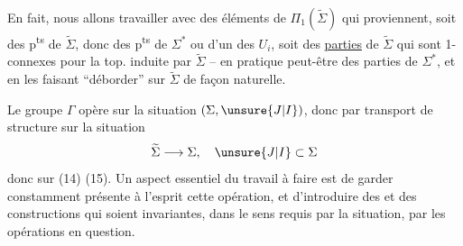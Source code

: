 En fait, nous allons travailler avec des éléments de $\Pi_1(\widetilde\Sigma)$ qui proviennent, soit des p\textsuperscript{ts} de $\widetilde\Sigma$, donc des p\textsuperscript{ts} de $\Sigma^*$ ou d'un des $U_i$, soit des \uline{parties} de $\widetilde\Sigma$ qui sont 1-connexes pour la top. induite par $\widetilde\Sigma$ -- en pratique peut-être des parties  de $\Sigma^*$, et en les faisant ``déborder'' sur $\widetilde\Sigma$ de façon naturelle.

Le groupe $\Gamma$ opère sur la situation  $(\Sigma,\unsure{J|I})$, donc par transport de structure sur la situation
\[
\widetilde\Sigma\longrightarrow\Sigma,\quad \unsure{J|I}\subset\Sigma
\]
donc sur  (14) (15). Un aspect essentiel du travail à faire est de garder  constamment présente à l'esprit cette opération, et d'introduire des  et des constructions qui soient invariantes, dans le sens requis par la situation, par les opérations en question.

